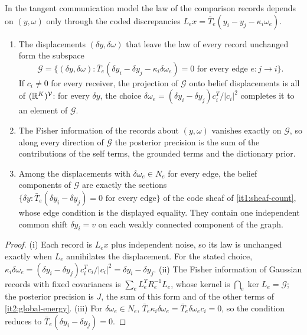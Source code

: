 In the tangent communication model the law of the comparison records depends on $(y,\omega)$ only through the coded discrepancies $L_ex=\bar T_e(y_i-y_j-\kappa_i\omega_e)$.
\begin{enumerate}
\item[(i)] The displacements $(\delta y,\delta\omega)$ that leave the law of every record unchanged form the subspace
\begin{equation}
\mathcal G=\bigl\{(\delta y,\delta\omega):\bar T_e(\delta y_i-\delta y_j-\kappa_i\delta\omega_e)=0\text{ for every edge }e:j\to i\bigr\}.
\label{it2:gauge-space}
\end{equation}
If $c_i\neq0$ for every receiver, the projection of $\mathcal G$ onto belief displacements is all of $(\mathbb R^K)^{\mathcal V}$: for every $\delta y$, the choice $\delta\omega_e=(\delta y_i-\delta y_j)c_i^T/\vert c_i\vert^2$ completes it to an element of $\mathcal G$.
\item[(ii)] The Fisher information of the records about $(y,\omega)$ vanishes exactly on $\mathcal G$, so along every direction of $\mathcal G$ the posterior precision is the sum of the contributions of the self terms, the grounded terms and the dictionary prior.
\item[(iii)] Among the displacements with $\delta\omega_e\in N_e$ for every edge, the belief components of $\mathcal G$ are exactly the sections $\{\delta y:\bar T_e(\delta y_i-\delta y_j)=0\text{ for every edge}\}$ of the code sheaf of \cref{it1:sheaf-count}, whose edge condition is the displayed equality. They contain one independent common shift $\delta y_i=v$ on each weakly connected component of the graph.
\end{enumerate}
\begin{proof}
(i) Each record is $L_ex$ plus independent noise, so its law is unchanged exactly when $L_e$ annihilates the displacement. For the stated choice, $\kappa_i\delta\omega_e=(\delta y_i-\delta y_j)c_i^Tc_i/\vert c_i\vert^2=\delta y_i-\delta y_j$. (ii) The Fisher information of Gaussian records with fixed covariances is $\sum_eL_e^TR_e^{-1}L_e$, whose kernel is $\bigcap_e\ker L_e=\mathcal G$; the posterior precision is $J$, the sum of this form and of the other terms of \cref{it2:global-energy}. (iii) For $\delta\omega_e\in N_e$, $\bar T_e\kappa_i\delta\omega_e=\bar T_e\delta\omega_ec_i=0$, so the condition reduces to $\bar T_e(\delta y_i-\delta y_j)=0$.
\end{proof}

